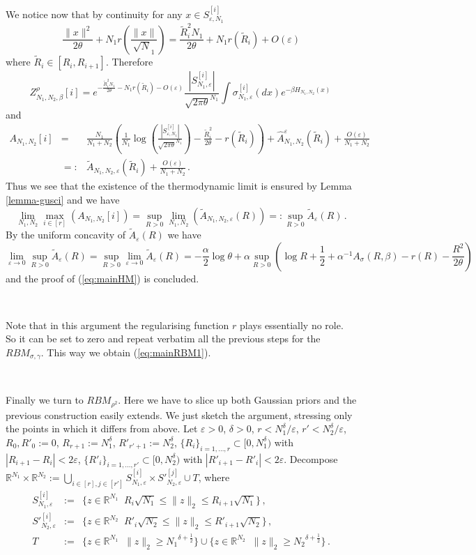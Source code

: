 \documentclass[10pt,oneside,a4paper,reqno]{amsart}  %
\newcommand{\OOO}[1]{O \left(#1\right)}
\def\be{\begin{equation}}
\def\ee{\end{equation}}
\def\bea{\begin{eqnarray}}
\def\eea{\end{eqnarray}}
\def\nn{\nonumber}
\def\a{\alpha}
\def\e{\varepsilon}
\def\d{\delta}
\def\g{\gamma}
\def\b{\beta}
\def\r{\rho}
\def\s{\sigma}
\def\R{\mathbb{R}}
\theoremstyle{plain}
\numberwithin{equation}{section}
\begin{document}
We notice now that by continuity for any $x\in S^{[i]}_{\e,N_1}$
\be\label{eq:Rtilde}
\frac{\|x\|^2}{2\theta}+N_1r\left(\frac{\|x\|}{\sqrt N_1}\right)=\frac{\tilde R_i^2N_1}{2\theta}+N_1r\left(\tilde R_i\right)+\OOO{\e} %
\ee
where $\tilde R_i\in[R_i, R_{i+1}]$. Therefore
\be
Z^{\r}_{N_1,N_2,\b}[i]=e^{-\frac{\tilde R_i^2N_1}{2\theta}-N_1r\left(\tilde R_i \right)-\OOO{\e}}\frac{|S^{[i]}_{N_1,\e}|}{\sqrt{2\pi\theta}^{N_1}}\int \s^{[i]}_{N_1,\e}(dx)e^{-\b H_{N_1,N_2}(x)}\,
\ee
and
\bea
A_{N_1,N_2}[i]&=&\frac{N_1}{N_1+N_2}\left(\frac{1}{N_1}\log\left(\frac{|S^{[i]}_{\e,N_1}|}{\sqrt{2\pi\theta}^{N_1}}\right)-\frac{\tilde R_i^2}{2\theta }-r\left(\tilde R_i\right)\right)+\widehat A_{N_1,N_2}^{\e}\left(\tilde R_i\right)+\frac{\OOO{\e}}{N_1+N_2}\nn\\
&=:&\tilde A_{N_1,N_2,\e}\left(\tilde R_i\right)+\frac{\OOO{\e}}{N_1+N_2}\nn\,.
\eea
Thus we see that the existence of the thermodynamic limit is ensured by Lemma \ref{lemma-gusci} and we have
$$
\lim_{N_1,N_2}\max_{i\in[r]}\left(A_{N_1,N_2}[i]\right)=\sup_{R>0}\lim_{N_1,N_2}\left(\tilde A_{N_1,N_2,\e}(R)\right)=:\sup_{R>0}\tilde A_\e(R)\,. 
$$
By the uniform concavity of $\tilde A_\e(R)$ we have
$$
\lim_{\e\to0}\sup_{R>0}\tilde A_\e(R)=\sup_{R>0}\lim_{\e\to0}\tilde A_\e(R)=-\frac{\a}{2}\log\theta+\a\sup_{R>0}\left(\log R+\frac12+\a^{-1}A_{\s}(R,\b)-r(R)-\frac{R^2}{2\theta}\right)\,
$$
and the proof of (\ref{eq:mainHM}) is concluded. 

\

Note that in this argument the regularising function $r$ plays essentially no role. So it can be set to zero and repeat verbatim all the previous steps for the $RBM_{\s,\g}$. This way we obtain (\ref{eq:mainRBM1}). 

\

Finally we turn to $RBM_{\r^2}$. Here we have to slice up both Gaussian priors and the previous construction easily extends. We just sketch the argument, stressing only the points in which it differs from above. Let $\e>0$, $\d>0$, $r<N_1^{\d}/\e$, $r'<N_2^{\d}/\e$, $R_0,R'_0:=0$, $R_{r+1}:=N_1^{\d}$, $R'_{r'+1}:=N_2^{\d}$, $\{R_i\}_{i=1,\ldots,r}\subset[0,N_1^{\d})$ with $|R_{i+1}-R_i|<2\e$, $\{R'_i\}_{i=1,\ldots,r'}\subset[0,N_2^{\d})$ with $|R'_{i+1}-R'_i|<2\e$. Decompose
$
\R^{N_1}\times \R^{N_2}:=\bigcup_{i\in[r], j\in[r']}S_{N_1,\e}^{[i]}\times {S'}_{N_2,\e}^{[j]} \cup T
$, where 
\bea
S^{[i]}_{N_1,\e}&:=&\{z\in\R^{N_1}\,\:\, R_i\sqrt{N_1}\leq \|z\|_2\leq R_{i+1}\sqrt{N_1}\}\,,\nn\\
{S'}^{[i]}_{N_2,\e}&:=&\{z\in\R^{N_2}\,\:\, R'_i\sqrt{N_2}\leq \|z\|_2\leq R'_{i+1}\sqrt{N_2}\}\,,\nn\\
T&:=&\{z\in\R^{N_1}\,\:\, \|z\|_2\geq {N_1}^{\d+\frac12}\}\cup \{z\in\R^{N_2}\,\:\, \|z\|_2\geq {N_2}^{\d+\frac12}\}\,.\nn
\eea
\end{document}
